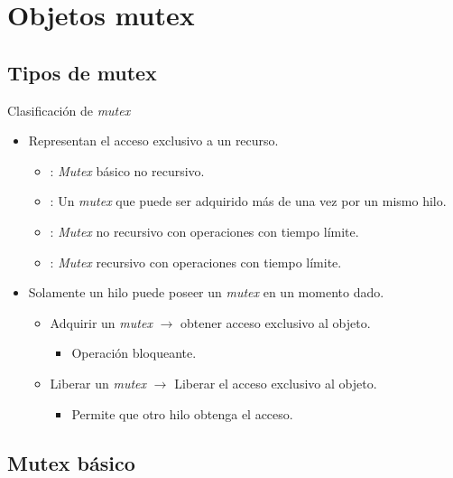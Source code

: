 \section{Objetos mutex}

\subsection{Tipos de mutex}

\begin{frame}{Clasificación de \emph{mutex}}
\begin{itemize}
  \item Representan el acceso exclusivo a un recurso.
    \begin{itemize}
      \item {}: \emph{Mutex} básico no recursivo.
      \item {}: Un \emph{mutex} que puede ser adquirido más de una vez por un mismo hilo.
      \item {}: \emph{Mutex} no recursivo con operaciones con tiempo límite.
      \item {}: \emph{Mutex} recursivo con operaciones con tiempo límite.
    \end{itemize}
  \item Solamente un hilo puede poseer un \emph{mutex} en un momento dado.
    \begin{itemize}
      \item Adquirir un \emph{mutex} $\rightarrow$ obtener acceso exclusivo al objeto.
        \begin{itemize}
          \item Operación bloqueante.
        \end{itemize}
      \item Liberar un \emph{mutex} $\rightarrow$ Liberar el acceso exclusivo al objeto.
        \begin{itemize}
          \item Permite que otro hilo obtenga el acceso.
        \end{itemize}
    \end{itemize}
\end{itemize}
\end{frame}

\subsection{Mutex básico}

